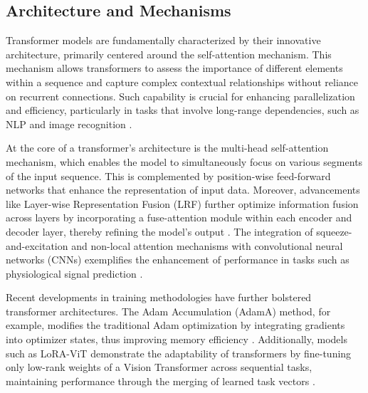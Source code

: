 
 





\subsection{Architecture and Mechanisms} \label{subsec:Architecture and Mechanisms}

Transformer models are fundamentally characterized by their innovative architecture, primarily centered around the self-attention mechanism. This mechanism allows transformers to assess the importance of different elements within a sequence and capture complex contextual relationships without reliance on recurrent connections. Such capability is crucial for enhancing parallelization and efficiency, particularly in tasks that involve long-range dependencies, such as NLP and image recognition \cite{wang2023environmenttransformerpolicyoptimization}.



At the core of a transformer's architecture is the multi-head self-attention mechanism, which enables the model to simultaneously focus on various segments of the input sequence. This is complemented by position-wise feed-forward networks that enhance the representation of input data. Moreover, advancements like Layer-wise Representation Fusion (LRF) further optimize information fusion across layers by incorporating a fuse-attention module within each encoder and decoder layer, thereby refining the model's output \cite{zheng2023layerwiserepresentationfusioncompositional}. The integration of squeeze-and-excitation and non-local attention mechanisms with convolutional neural networks (CNNs) exemplifies the enhancement of performance in tasks such as physiological signal prediction \cite{park2022attentionmechanismsphysiologicalsignal}.



Recent developments in training methodologies have further bolstered transformer architectures. The Adam Accumulation (AdamA) method, for example, modifies the traditional Adam optimization by integrating gradients into optimizer states, thus improving memory efficiency \cite{zhang2023adamaccumulationreducememory}. Additionally, models such as LoRA-ViT demonstrate the adaptability of transformers by fine-tuning only low-rank weights of a Vision Transformer across sequential tasks, maintaining performance through the merging of learned task vectors \cite{chitale2023taskarithmeticloracontinual}.



